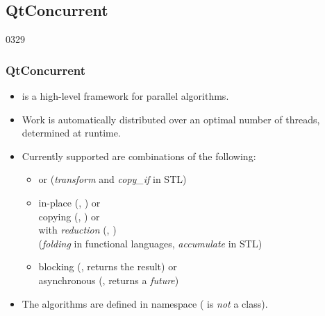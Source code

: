 %
%
%
%

\subsection{QtConcurrent}

\begin{slide}{0329}
\frametitle{QtConcurrent}\label{QtConcurrent}
  \begin{itemize}
  \item {} is a high-level framework for parallel algorithms.
  \item Work is automatically distributed over an optimal number of
    threads, determined at runtime.
  \item Currently supported are combinations of the following:
    \begin{itemize}
    \item {} or 
          (\textit{transform} and \textit{copy\_if} in STL)

    
    \item in-place (,
      ) or\\
      copying (, ) or\\
      with \emph{reduction} (, )\\
      (\emph{folding} in functional languages, \emph{accumulate} in STL)
    \item blocking (, returns the result) or\\
      asynchronous (, returns a \emph{future})
    \end{itemize}
  \item The algorithms are defined in namespace 
    ( is \emph{not} a class).
  \end{itemize}
\end{slide}

